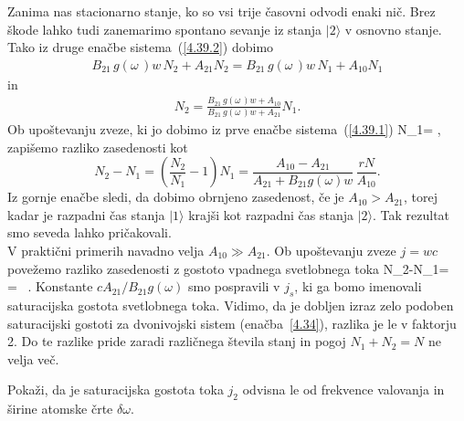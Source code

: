 \noindent
Zanima nas stacionarno stanje, ko so vsi trije časovni odvodi enaki nič. 
Brez škode lahko tudi zanemarimo spontano sevanje iz stanja
$|2\rangle$ v osnovno stanje. Tako iz druge enačbe sistema~(\ref{4.39.2}) 
dobimo
\begin{eqnarray}
B_{21}\,g(\omega\,)w\, N_{2}+A_{21}N_{2} = B_{21}\,g(\omega\,)w\, N_{1} + A_{10}N_{1} 
\end{eqnarray}
in
\begin{eqnarray}
N_2 = \frac{B_{21}\,g(\omega\,)w + A_{10}}{B_{21}\,g(\omega\,)w+A_{21}}N_1.  
\end{eqnarray}
Ob upoštevanju zveze, ki jo dobimo iz prve enačbe sistema~(\ref{4.39.1})
\beq
N_1= , 
\eeq
zapišemo razliko zasedenosti kot 
\begin{equation}
N_{2}-N_{1}=\left(\frac{N_2}{N_1}-1\right)N_1=\frac{A_{10}-A_{21}}{A_{21}+
B_{21}g(\omega)w} \,\frac{rN}{A_{10}}.
\label{4.42}
\end{equation}
Iz gornje enačbe sledi, da dobimo obrnjeno zasedenost, če je $A_{10}>A_{21}$, torej kadar je
razpadni čas stanja $|1\rangle$ krajši kot razpadni čas stanja $|2\rangle$.
Tak rezultat smo seveda lahko pričakovali.\\

\noindent
V praktični primerih navadno velja $A_{10}\gg A_{21}$. Ob upoštevanju zveze $j=wc$ povežemo
razliko zasedenosti z gostoto vpadnega svetlobnega toka
\beq
N_{2}-N_{1}= \,  = 
 \, .
\label{eq:3n_N}
\eeq
Konstante $c A_{21}/B_{21}g(\omega)$ smo pospravili v $j_s$, ki ga bomo imenovali 
saturacijska gostota svetlobnega toka. Vidimo, da je dobljen
izraz zelo podoben saturacijski gostoti za dvonivojski sistem (enačba~\ref{4.34}), razlika je le
v faktorju 2. Do te razlike pride zaradi različnega števila stanj in pogoj $N_{1}+N_{2}=N$
ne velja več. \\

\begin{definition}
 Pokaži, da je saturacijska gostota toka $j_2$ odvisna le od frekvence valovanja in širine 
 atomske črte $\delta \omega$. 
\end{definition}


